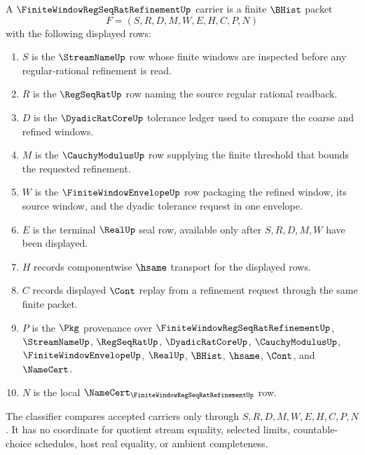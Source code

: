 \begin{definition}
\label{def:finite-window-regseqrat-refinement-carrier}
A $\FiniteWindowRegSeqRatRefinementUp$ carrier is a finite $\BHist$ packet
$$
F=(S,R,D,M,W,E,H,C,P,N)
$$
with the following displayed rows:
\begin{enumerate}
\item $S$ is the $\StreamNameUp$ row whose finite windows are inspected before any regular-rational refinement is read.
\item $R$ is the $\RegSeqRatUp$ row naming the source regular rational readback.
\item $D$ is the $\DyadicRatCoreUp$ tolerance ledger used to compare the coarse and refined windows.
\item $M$ is the $\CauchyModulusUp$ row supplying the finite threshold that bounds the requested refinement.
\item $W$ is the $\FiniteWindowEnvelopeUp$ row packaging the refined window, its source window, and the dyadic tolerance request in one envelope.
\item $E$ is the terminal $\RealUp$ seal row, available only after $S,R,D,M,W$ have been displayed.
\item $H$ records componentwise $\hsame$ transport for the displayed rows.
\item $C$ records displayed $\Cont$ replay from a refinement request through the same finite packet.
\item $P$ is the $\Pkg$ provenance over $\FiniteWindowRegSeqRatRefinementUp$, $\StreamNameUp$, $\RegSeqRatUp$, $\DyadicRatCoreUp$, $\CauchyModulusUp$, $\FiniteWindowEnvelopeUp$, $\RealUp$, $\BHist$, $\hsame$, $\Cont$, and $\NameCert$.
\item $N$ is the local $\NameCert_{\FiniteWindowRegSeqRatRefinementUp}$ row.
\end{enumerate}
The classifier compares accepted carriers only through $S,R,D,M,W,E,H,C,P,N$. It has no coordinate for quotient stream equality, selected limits, countable-choice schedules, host real equality, or ambient completeness.
\end{definition}

